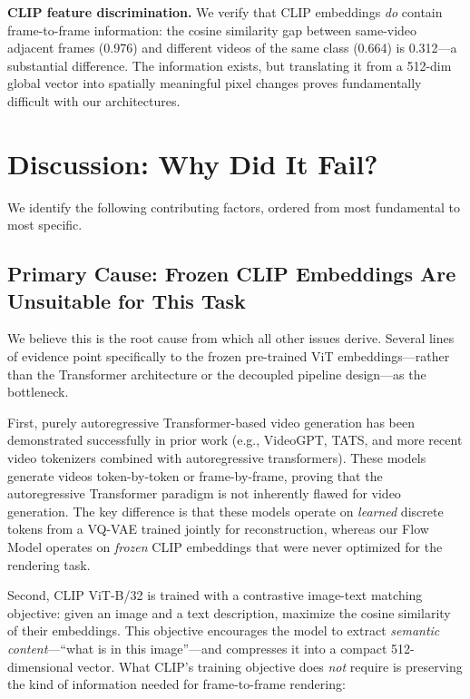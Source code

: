 \documentclass[10pt,twocolumn,letterpaper]{article}
\begin{document}
\textbf{CLIP feature discrimination.} We verify that CLIP embeddings
\emph{do} contain frame-to-frame information: the cosine similarity gap
between same-video adjacent frames (0.976) and different videos of the
same class (0.664) is 0.312---a substantial difference. The information
exists, but translating it from a 512-dim global vector into spatially
meaningful pixel changes proves fundamentally difficult with our
architectures.

\section{Discussion: Why Did It Fail?}

We identify the following contributing factors, ordered from most
fundamental to most specific.

\subsection{Primary Cause: Frozen CLIP Embeddings Are Unsuitable for This Task}

We believe this is the root cause from which all other issues derive.
Several lines of evidence point specifically to the frozen pre-trained
ViT embeddings---rather than the Transformer architecture or the decoupled
pipeline design---as the bottleneck.

First, purely autoregressive Transformer-based video generation has been
demonstrated successfully in prior work (e.g., VideoGPT, TATS, and more
recent video tokenizers combined with autoregressive transformers). These
models generate videos token-by-token or frame-by-frame, proving that the
autoregressive Transformer paradigm is not inherently flawed for video
generation. The key difference is that these models operate on
\emph{learned} discrete tokens from a VQ-VAE trained jointly for
reconstruction, whereas our Flow Model operates on \emph{frozen} CLIP
embeddings that were never optimized for the rendering task.

Second, CLIP ViT-B/32 is trained with a contrastive image-text matching
objective: given an image and a text description, maximize the cosine
similarity of their embeddings. This objective encourages the model to
extract \emph{semantic content}---``what is in this image''---and
compresses it into a compact 512-dimensional vector. What CLIP's training
objective does \emph{not} require is preserving the kind of information
needed for frame-to-frame rendering:
\end{document}

